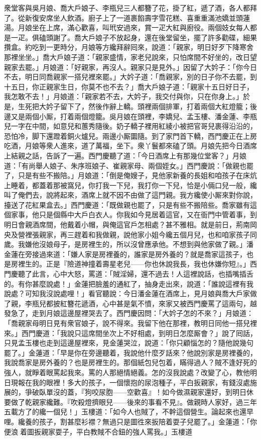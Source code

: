 衆堂客與吳月娘、喬大戶娘子、李瓶兒三人都簪了花，掛了紅，遞了酒，各人都拜了。從新復安席坐人飲酒。廚子上了一道裹餡壽字雪花糕、喜重重滿池嬌並頭蓮湯。月娘坐在上席，滿心歡喜，叫玳安過來，賞一疋大紅與廚役。兩個妓女每人都是一疋。俱磕頭謝了。喬大戶娘子不放起身，還在後堂留坐，擺了許多勸碟，細果攢盒。約吃到一更時分，月娘等方纔拜辭囘來，說道：「親家，明日好歹下降寒舍那裡坐坐。」喬大戶娘子道：「親家盛情，家老兒說來，只怕席間不好坐的，改日望親家去罷。」月娘道：「好親家，再沒人。親家只是見外。」因留了大妗子：「你今日不去，明日同喬親家一搭兒裡來罷。」大妗子道：「喬親家，別的日子你不去罷，到十五日，你正親家生日，你莫不也不去？」喬大戶娘子道：「親家十五日好日子，我怎敢不去！」月娘道：「親家若不去，大妗子，我交付與你，只在你身上。」於是，生死把大妗子留下了，然後作辭上轎。頭裡兩個排軍，打着兩個大紅燈籠；後邊又是兩個小厮，打着兩個燈籠。吳月娘在頭裡，李嬌兒、孟玉樓、潘金蓮、李瓶兒一字在中間，如意兒和蕙秀隨後。奶子轎子裡用紅綾小被把官哥兒裹得沿沿的，恐怕冷，脚下還蹬着銅火爐兒。兩邊小厮圜隨。到了家門首下轎，西門慶正在上房吃酒，月娘等衆人進來，道了萬福，坐下。衆丫鬟都來磕了頭。月娘先把今日酒席上結親之話，告訴了一遍。西門慶聽了道：「今日酒席上有那幾位堂客？」月娘道：「有尚舉人娘子、朱序班娘子、崔親家母、兩個姪女。」西門慶說：「做親也罷了，只是有些不搬陪。」月娘道：「倒是俺嫂子，見他家新養的長姐和咱孩子在床炕上睡着，都蓋着那被窩兒，你打我一下兒，我打你一下兒，恰是小倆口兒一般，纔叫了俺們去，說將起來，酒席上就不因不由做了這門親。我方纔使小厮來對你說，擡送了花紅果盒去。」西門慶道：「既做親也罷了，只是有些不搬陪些。喬家雖有這個家事，他只是個縣中大戶白衣人。你我如今見居着這官，又在衙門中管着事，到明日會親酒席間，他戴着小帽，與俺這官戶怎相處？甚不雅相。就是前日，荊南岡央及營裡張親家，再三趕着和我做親，說他家小姐今纔五個月兒，也和咱家孩子同歲。我嫌他沒娘母子，是房裡生的，所以沒曾應承他。不想到與他家做了親。」潘金蓮在旁接過來道：「嫌人家是房裡養的，誰家是房外養的？就是喬家這孩子，也是房裡生的。正是『險道神撞着壽星老兒——你也休說我長，我也休嫌你短』。」西門慶聽了此言，心中大怒，罵道：「賊淫婦，還不過去！人這裡說話，也插嘴插舌的。有你甚麼說處！」金蓮把臉羞的通紅了，抽身走出來，說道：「誰說這裡有我說處？可知我沒說處哩！」{}看官聽說：今日潘金蓮在酒席上，見月娘與喬大戶家做了親，李瓶兒都披紅簪花遞酒，心中甚是氣不憤，來家又被西門慶罵了這兩句，越發急了，走到月娘這邊屋裡哭去了。西門慶因問：「大妗子怎的不來？」月娘道：「喬親家母明日見有衆官娘子，說不得來。我留下他在那裡，教明日同他一搭兒裡來。」西門慶道：「我說只這席間坐次上不好相處，到明日怎麼厮會？」說了囘話，只見孟玉樓也走到這邊屋裡來，見金蓮哭泣，說道：「你只顧惱怎的？隨他說幾句罷了。」金蓮道：「早是你在旁邊聽着，我說他什麼歹話來？他說別家是房裡養的，我說喬家是房外養的？也是房裡生的。那個紙包兒包着，瞞得過人？賊不逢好死的強人，就睜着眼罵起我來。罵的人那絕情絕義。怎的沒我說處？改變了心，教他明日現報在我的眼裡！多大的孩子，一個懷抱的尿泡種子，平白扳親家，有錢沒處施展的，爭破臥單沒的蓋，『狗咬尿胞——空歡喜』！如今做濕親家還好，到明日休要做了乾親家纔難。『吹殺燈擠眼兒——後來的事看不見』。做親時人家好，過三年五載方了的纔一個兒！」玉樓道：「如今人也賊了，不幹這個營生。論起來也還早哩。纔養的孩子，割甚麼衫襟？無過只是圖徃來扳陪着耍子兒罷了。」{}金蓮道：「你便浪𢵞着圖扳親家耍子，平白教賊不合鈕的強人罵我。」玉樓道